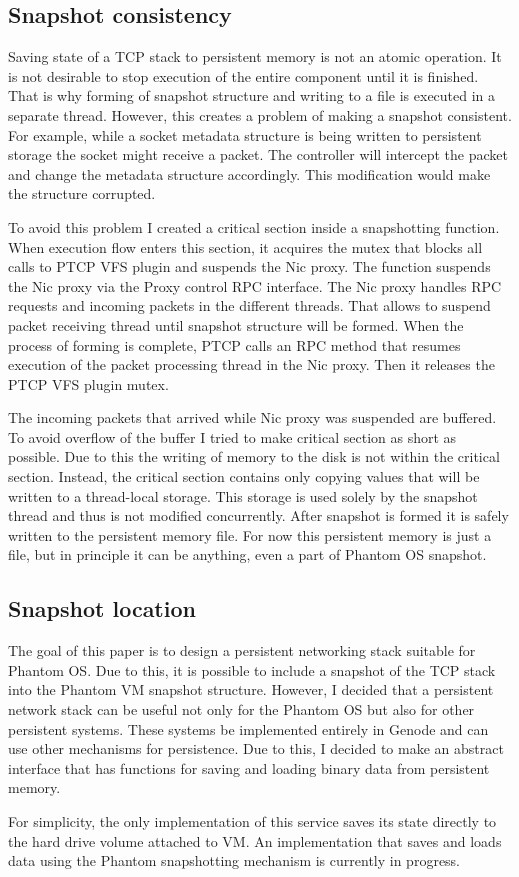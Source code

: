 \subsection{Snapshot consistency}

Saving state of a TCP stack to persistent memory is not an atomic operation. It
is not desirable to stop execution of the entire component until it is
finished. That is why forming of snapshot structure and writing to a file is
executed in a separate thread. However, this creates a problem of making a
snapshot consistent. For example, while a socket metadata structure is being
written to persistent storage the socket might receive a packet. The controller
will intercept the packet and change the metadata structure accordingly. This
modification would make the structure corrupted. 

To avoid this problem I created a critical section inside a snapshotting
function. When execution flow enters this section, it acquires the mutex that
blocks all calls to PTCP VFS plugin and suspends the Nic proxy. The function
suspends the Nic proxy via the Proxy control RPC interface. The Nic proxy 
handles RPC requests and incoming packets in the different threads. That allows
to suspend packet receiving thread until snapshot structure will be formed.
When the process of forming is complete, PTCP calls an RPC method that resumes
execution of the packet processing thread in the Nic proxy. Then it releases
the PTCP VFS plugin mutex. 

The incoming packets that arrived while Nic proxy was suspended are buffered.
To avoid overflow of the buffer I tried to make critical section as short as
possible. Due to this the writing of memory to the disk is not within the
critical section. Instead, the critical section contains only copying values 
that will be written to a thread-local storage. This storage is used solely by
the snapshot thread and thus is not modified concurrently. After snapshot is 
formed it is safely written to the persistent memory file. For now this
persistent memory is just a file, but in principle it can be anything, even 
a part of Phantom OS snapshot.

\subsection{Snapshot location}

The goal of this paper is to design a persistent networking stack suitable for
Phantom OS. Due to this, it is possible to include a snapshot of the TCP stack
into the Phantom VM snapshot structure. However, I decided that a persistent
network stack can be useful not only for the Phantom OS but also for other
persistent systems. These systems be implemented entirely in Genode and can use
other mechanisms for persistence. Due to this, I decided to make an abstract
interface that has functions for saving and loading binary data from persistent
memory.

For simplicity, the only implementation of this service saves its state
directly to the hard drive volume attached to VM. An implementation that saves
and loads data using the Phantom snapshotting mechanism is currently in
progress.


